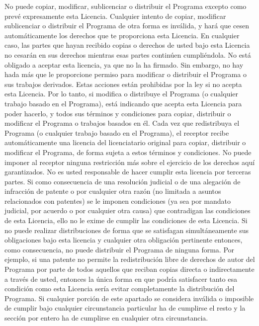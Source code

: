 No puede copiar, modificar, sublicenciar o distribuir el Programa excepto como prevé expresamente esta Licencia. Cualquier intento de copiar, modificar sublicenciar o distribuir el Programa de otra forma es inválida, y hará que cesen automáticamente los derechos que te proporciona esta Licencia. En cualquier caso, las partes que hayan recibido copias o derechos de usted bajo esta Licencia no cesarán en sus derechos mientras esas partes continúen cumpliéndola.
No está obligado a aceptar esta licencia, ya que no la ha firmado. Sin embargo, no hay hada más que le proporcione permiso para modificar o distribuir el Programa o sus trabajos derivados. Estas acciones están prohibidas por la ley si no acepta esta Licencia. Por lo tanto, si modifica o distribuye el Programa (o cualquier trabajo basado en el Programa), está indicando que acepta esta Licencia para poder hacerlo, y todos sus términos y condiciones para copiar, distribuir o modificar el Programa o trabajos basados en él.
Cada vez que redistribuya el Programa (o cualquier trabajo basado en el Programa), el receptor recibe automáticamente una licencia del licenciatario original para copiar, distribuir o modificar el Programa, de forma sujeta a estos términos y condiciones. No puede imponer al receptor ninguna restricción más sobre el ejercicio de los derechos aquí garantizados. No es usted responsable de hacer cumplir esta licencia por terceras partes.
Si como consecuencia de una resolución judicial o de una alegación de infracción de patente o por cualquier otra razón (no limitada a asuntos relacionados con patentes) se le imponen condiciones (ya sea por mandato judicial, por acuerdo o por cualquier otra causa) que contradigan las condiciones de esta Licencia, ello no le exime de cumplir las condiciones de esta Licencia. Si no puede realizar distribuciones de forma que se satisfagan simultáneamente sus obligaciones bajo esta licencia y cualquier otra obligación pertinente entonces, como consecuencia, no puede distribuir el Programa de ninguna forma. Por ejemplo, si una patente no permite la redistribución libre de derechos de autor del Programa por parte de todos aquellos que reciban copias directa o indirectamente a través de usted, entonces la única forma en que podría satisfacer tanto esa condición como esta Licencia sería evitar completamente la distribución del Programa.
Si cualquier porción de este apartado se considera inválida o imposible de cumplir bajo cualquier circunstancia particular ha de cumplirse el resto y la sección por entero ha de cumplirse en cualquier otra circunstancia.

